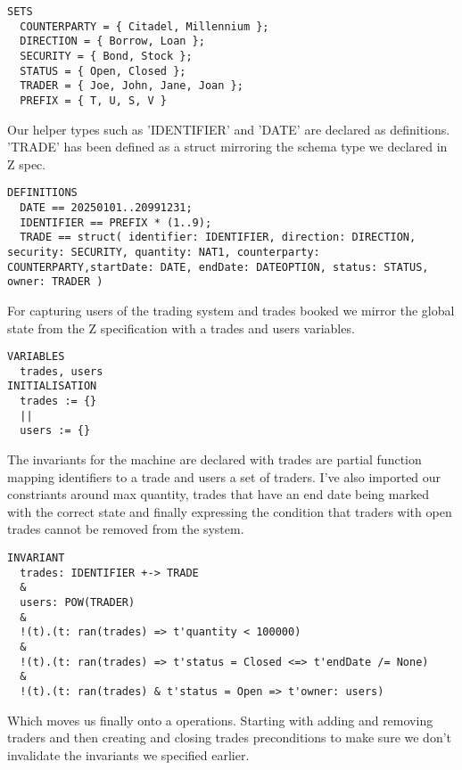 \documentclass{article}
\begin{document}
\begin{verbatim}
SETS 
  COUNTERPARTY = { Citadel, Millennium };
  DIRECTION = { Borrow, Loan };
  SECURITY = { Bond, Stock };
  STATUS = { Open, Closed };
  TRADER = { Joe, John, Jane, Joan };
  PREFIX = { T, U, S, V }
\end{verbatim}

\hspace{-0.7cm} Our helper types such as 'IDENTIFIER' and 'DATE' are declared as definitions. 'TRADE' has been defined as a struct mirroring the schema type we declared in Z spec.

\begin{verbatim}
DEFINITIONS
  DATE == 20250101..20991231;
  IDENTIFIER == PREFIX * (1..9);
  TRADE == struct( identifier: IDENTIFIER, direction: DIRECTION, security: SECURITY, quantity: NAT1, counterparty: COUNTERPARTY,startDate: DATE, endDate: DATEOPTION, status: STATUS, owner: TRADER )
\end{verbatim}

\hspace{-0.7cm} For capturing users of the trading system and trades booked we mirror the global state from the Z specification with a trades and users variables.

\begin{verbatim}
VARIABLES
  trades, users
INITIALISATION
  trades := {}
  ||
  users := {}
\end{verbatim}
    
\hspace{-0.7cm} The invariants for the machine are declared with trades are partial function mapping identifiers to a trade and users a set of traders. I've also imported our constriants around max quantity, trades that have an end date being marked with the correct state and finally expressing the condition that traders with open trades cannot be removed from the system.

\begin{verbatim}
INVARIANT
  trades: IDENTIFIER +-> TRADE
  &
  users: POW(TRADER)    
  &
  !(t).(t: ran(trades) => t'quantity < 100000)
  &
  !(t).(t: ran(trades) => t'status = Closed <=> t'endDate /= None)
  &
  !(t).(t: ran(trades) & t'status = Open => t'owner: users)
\end{verbatim}

\hspace{-0.7cm} Which moves us finally onto a operations. Starting with adding and removing traders and then creating and closing trades preconditions to make sure we don't invalidate the invariants we specified earlier. 
\end{document}
